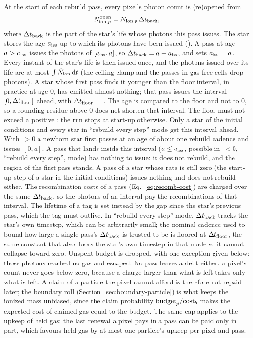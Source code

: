 At the start of
each rebuild pass, every pixel's photon count is (re)opened from
\begin{equation}
  N_{{\rm ion},p}^{\rm open} =
  \dot N_{{\rm ion},p}\,\Delta t_{\rm back},
  \label{eq:budget-open}
\end{equation}
where $\Delta t_{\rm back}$ is the part of the star's life whose photons
this pass issues. The star stores the age $a_{\rm iss}$ up to which its
photons have been issued (). A pass at
age $a > a_{\rm iss}$ issues the photons of $[a_{\rm iss}, a]$, so
$\Delta t_{\rm back} = a - a_{\rm iss}$, and sets $a_{\rm iss} = a$.
Every instant of the star's life is then issued once, and the photons
issued over its life are at most $\int \dot N_{\rm ion}\,{\rm d}t$ (the
ceiling clamp and the passes in gas-free cells drop photons). A star whose
first pass finds it younger than the floor interval, in practice at age 0, has
emitted almost nothing; that pass issues the
interval $[0, \Delta t_{\rm floor}]$ ahead, with $\Delta t_{\rm floor}$ =
. The age is compared to the floor
and not to 0, so a rounding residue above 0 does not shorten that interval.
The floor must not exceed a positive : the run
stops at start-up otherwise. Only a star of the initial
conditions and every star in ``rebuild every step'' mode get this interval
ahead. With $\,>0$ a newborn star first passes
at an age of about one rebuild cadence and issues $[0, a]$. A pass that lands inside this
interval ($a \le a_{\rm iss}$, possible in
$\,<0$, ``rebuild every
step'', mode) has nothing to issue: it does not rebuild, and the region
of the first pass stands. A pass of a star whose rate is still zero (the
start-up step of a star in the initial conditions) issues nothing and
does not rebuild either. The recombination costs of a pass (Eq.~\ref{eq:recomb-cost})
are charged over the same $\Delta t_{\rm back}$, so the photons of an
interval pay the recombinations of that interval. The lifetime of a tag
is set instead by the gap since the star's previous pass, which the tag
must outlive. In ``rebuild every step'' mode, $\Delta t_{\rm back}$
tracks the star's own timestep, which can be arbitrarily small; the
nominal cadence used to bound how large a single pass's
$\Delta t_{\rm back}$ is trusted to be is floored at
$\Delta t_{\rm floor}$, the same constant that also floors the star's
own timestep in that mode so it cannot collapse toward zero. Unspent
budget is dropped, with one exception given below: those photons reached
no gas and escaped. No pass leaves a debt either: a pixel's count never goes
below zero, because a charge larger than what is left takes only
what is left. A claim of a particle the pixel cannot afford is
therefore not repaid later; the boundary roll
(Section~\ref{sec:boundary-particle}) is what keeps the ionized mass
unbiased, since the claim probability $\text{budget}_p/{\rm cost}_b$
makes the expected cost of claimed gas equal to the budget. The same
cap applies to the upkeep of held gas: the last renewal a pixel pays
in a pass can be paid only in part, which favours held gas by at most
one particle's upkeep per pixel and pass.

